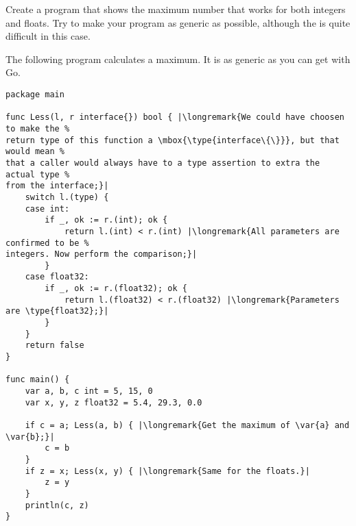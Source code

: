 \begin{Exercise}[title={Interfaces and max()},difficulty=5]
\Question
Create a program that shows the maximum number that works for both integers and floats.
Try to make your program as generic as possible, although the is quite difficult in
this case.
\end{Exercise}

\begin{Answer}
\Question
The following program calculates a maximum. It is as generic as you can get
with Go.

\begin{lstlisting}[caption="Generic way of calculating a maximum"]
package main

func Less(l, r interface{}) bool { |\longremark{We could have choosen to make the %
return type of this function a \mbox{\type{interface\{\}}}, but that would mean %
that a caller would always have to a type assertion to extra the actual type %
from the interface;}|
	switch l.(type) {
	case int:
		if _, ok := r.(int); ok {
			return l.(int) < r.(int) |\longremark{All parameters are confirmed to be %
integers. Now perform the comparison;}|
		}
	case float32:
		if _, ok := r.(float32); ok {
			return l.(float32) < r.(float32) |\longremark{Parameters are \type{float32};}|
		}
	}
	return false
}

func main() {
	var a, b, c int = 5, 15, 0
	var x, y, z float32 = 5.4, 29.3, 0.0

	if c = a; Less(a, b) { |\longremark{Get the maximum of \var{a} and \var{b};}|
		c = b
	}
	if z = x; Less(x, y) { |\longremark{Same for the floats.}|
		z = y
	}
	println(c, z)
}
\end{lstlisting}
\showremarks
\end{Answer}
